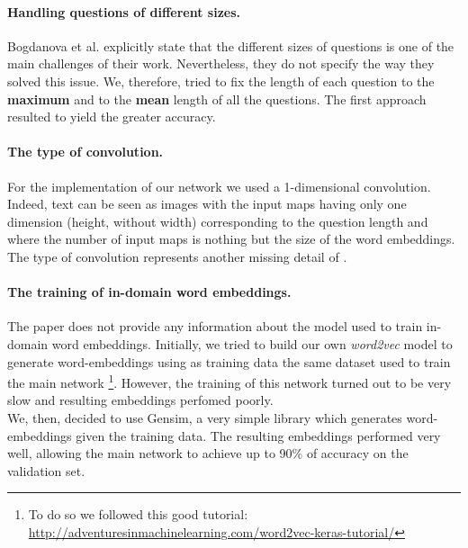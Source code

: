 \documentclass[10pt,twocolumn,letterpaper]{article}
\begin{document}
    \paragraph{Handling questions of different sizes.}
    Bogdanova et al. explicitly state that the different sizes of questions is one of the main challenges of their work. Nevertheless, they do not specify the way they solved this issue. We, therefore, tried to fix the length of each question to the \textbf{maximum} and to the \textbf{mean} length of all the questions. The first approach resulted to yield the greater accuracy.
    \paragraph{The type of convolution.}
    For the implementation of our network we used a 1-dimensional convolution. Indeed, text can be seen as images with the input maps having only one dimension (height, without width) corresponding to the question length and where the number of input maps is nothing but the size of the word embeddings. The type of convolution represents another missing detail of \cite{bogdanova2015detecting}.    
    \paragraph{The training of in-domain word embeddings.}
    The paper does not provide any information about the model used to train in-domain word embeddings. Initially, we tried to build our own \emph{word2vec} model \cite{mikolov2013distributed} to generate word-embeddings using as training data the same dataset used to train the main network \footnote{To do so we followed this good tutorial: \url{http://adventuresinmachinelearning.com/word2vec-keras-tutorial/}}. However, the training of this network turned out to be very slow and resulting embeddings perfomed poorly. \\
    We, then, decided to use Gensim, a very simple library which generates word-embeddings given the training data. The resulting embeddings performed very well, allowing the main network to achieve up to 90\% of accuracy on the validation set.

\end{document}
